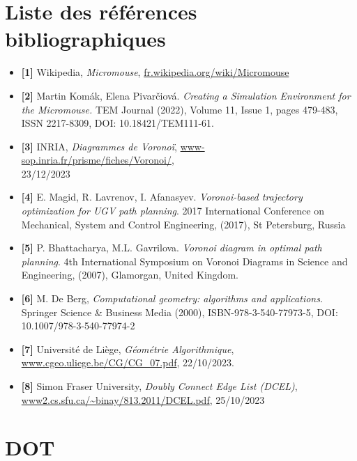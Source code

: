 \documentclass[a4paper]{article}
\begin{document}
\section*{Liste des références bibliographiques}
\begin{itemize}
    \item \textbf{[1]} \quad Wikipedia, \textit{Micromouse}, \url{fr.wikipedia.org/wiki/Micromouse}
    \item \textbf{[2]} \quad Martin Komák, Elena Pivarčiová.\textit{ Creating a Simulation Environment for the Micromouse.} TEM Journal (2022), Volume 11, Issue 1, pages 479-{483}, ISSN 2217-{8309}, {DOI}: 10.18421/TEM111-{61}.
    \item \textbf{[3]} \quad INRIA, \textit{Diagrammes de Voronoï}, \url{www-sop.inria.fr/prisme/fiches/Voronoi/},\\ 23/12/2023
    \item \textbf{[4]} \quad E. Magid, R. Lavrenov, I. Afanasyev.\textit{ Voronoi-based trajectory optimization for UGV path planning}. 2017 International Conference on Mechanical, System and Control Engineering, (2017), St Petersburg, Russia
    \item \textbf{[5]} \quad P. Bhattacharya, M.L. Gavrilova.\textit{ Voronoi diagram in optimal path planning}. 4th International Symposium on Voronoi Diagrams in Science and Engineering, (2007), Glamorgan, United Kingdom.
    \item \textbf{[6]} \quad M. De Berg, \textit{ Computational geometry: algorithms and applications}. Springer Science \& Business Media (2000), ISBN-{978}-{3}-{540}-{77973}-5, {DOI}: 10.1007/{978}-{3}-{540}-{77974}-2
    \item \textbf{[7]} \quad Université de Liège, \textit{Géométrie Algorithmique}, \url{www.cgeo.uliege.be/CG/CG_07.pdf}, 22/10/2023.
    \item \textbf{[8]} \quad Simon Fraser University, \textit{Doubly Connect Edge List (DCEL)}, \url{www2.cs.sfu.ca/~binay/813.2011/DCEL.pdf}, 25/10/2023
\end{itemize}


\section*{DOT}
\end{document}
